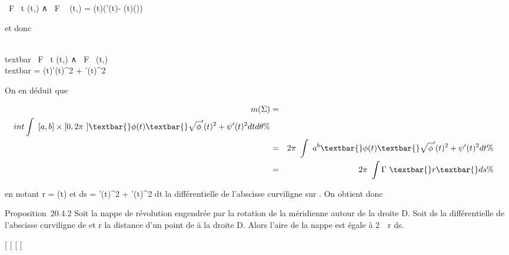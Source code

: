  \partial~F \over \partial~t (t,\theta) ∧ \partial~F \over \partial~\theta
(t,\theta) = \phi(t)\left (\phi'(t)\veck -
\psi(t)\vecu(\theta)\right )

et donc

\\textbar{} \partial~F \over \partial~t (t,\theta) ∧ \partial~F
\over \partial~\theta (t,\theta)\\textbar{} =
\textbar{}\phi(t)\textbar{}\sqrt\phi'(t)^2  +
\psi'(t)^2

On en déduit que

\begin{align*} m(\Sigma)& =& \\int
 \int ~
{[}a,b{]}\times{[}0,2\pi~{]}\textbar{}\phi(t)\textbar{}\sqrt\phi'(t)^2
 + \psi'(t)^2 dt d\theta\%& \\ &
=& 2\pi~\int ~
a^b\textbar{}\phi(t)\textbar{}\sqrt\phi'(t)^2
 + \psi'(t)^2 dt \%& \\ &
=& 2\pi~\int  \Gamma~\textbar{}r\textbar{} ds
\%& \\ \end{align*}

en notant r = \phi(t) et ds = \sqrt\phi'(t)^2  +
\psi'(t)^2 dt la différentielle de l'abscisse curviligne sur
\Gamma. On obtient donc

Proposition~20.4.2 Soit \Sigma la nappe de révolution engendrée par la
rotation de la méridienne \Gamma autour de la droite D. Soit ds la
différentielle de l'abscisse curviligne de \Gamma et r la distance d'un point
de \Gamma à la droite D. Alors l'aire de la nappe est égale à
2\pi~\int  \Gamma~r ds.

{[}
{[}
{[}
{[}

